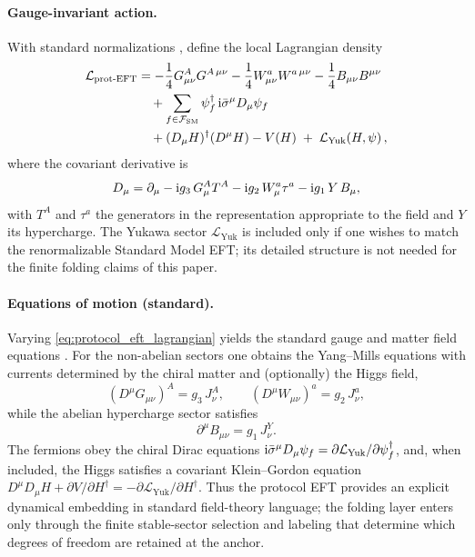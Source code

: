 \paragraph{Gauge-invariant action.}
With standard normalizations \cite{PeskinSchroeder1995,WeinbergQFT1995,PDGRPP2024}, define the local Lagrangian density
\begin{align}
\mathcal{L}_{\mathrm{prot\text{-}EFT}}
&=
-\frac{1}{4}G_{\mu\nu}^A G^{A\,\mu\nu}
-\frac{1}{4}W_{\mu\nu}^a W^{a\,\mu\nu}
-\frac{1}{4}B_{\mu\nu} B^{\mu\nu}
\nonumber\\
&\quad
+\sum_{f\in\mathcal{F}_{\mathrm{SM}}}\psi_f^\dagger\,\mathrm{i} \bar{\sigma}^\mu D_\mu \psi_f
\nonumber\\
&\quad
+(D_\mu H)^\dagger (D^\mu H)-V(H)
\;+\;\mathcal{L}_{\mathrm{Yuk}}(H,\psi)\,,
\label{eq:protocol_eft_lagrangian}
\end{align}
where the covariant derivative is
\begin{equation}
D_\mu=\partial_\mu-\mathrm{i} g_3\,G_\mu^A T^A-\mathrm{i} g_2\,W_\mu^a \tau^a-\mathrm{i} g_1\,Y\,B_\mu,
\label{eq:protocol_eft_covariant_derivative}
\end{equation}
with $T^A$ and $\tau^a$ the generators in the representation appropriate to the field and $Y$ its hypercharge.
The Yukawa sector $\mathcal{L}_{\mathrm{Yuk}}$ is included only if one wishes to match the renormalizable Standard Model EFT; its detailed structure is not needed for the finite folding claims of this paper.

\paragraph{Equations of motion (standard).}
Varying \eqref{eq:protocol_eft_lagrangian} yields the standard gauge and matter field equations \cite{PeskinSchroeder1995,WeinbergQFT1995,PDGRPP2024}.
For the non-abelian sectors one obtains the Yang--Mills equations with currents determined by the chiral matter and (optionally) the Higgs field,
\begin{equation}
(D^\mu G_{\mu\nu})^A = g_3\,J^A_\nu,
\qquad
(D^\mu W_{\mu\nu})^a = g_2\,J^a_\nu,
\end{equation}
while the abelian hypercharge sector satisfies
\begin{equation}
\partial^\mu B_{\mu\nu} = g_1\,J^Y_\nu.
\end{equation}
The fermions obey the chiral Dirac equations $\mathrm{i} \bar{\sigma}^\mu D_\mu\psi_f=\partial\mathcal{L}_{\mathrm{Yuk}}/\partial\psi_f^\dagger$, and, when included, the Higgs satisfies a covariant Klein--Gordon equation $D^\mu D_\mu H+\partial V/\partial H^\dagger = -\partial\mathcal{L}_{\mathrm{Yuk}}/\partial H^\dagger$.
Thus the protocol EFT provides an explicit dynamical embedding in standard field-theory language; the folding layer enters only through the finite stable-sector selection and labeling that determine which degrees of freedom are retained at the anchor.

